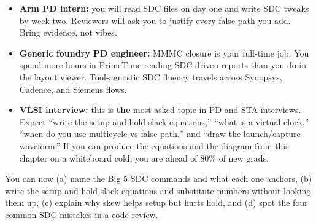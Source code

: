 \begin{pdnote}
\begin{itemize}
  \item \textbf{Arm PD intern:} you will read SDC files on day one and write SDC tweaks by week two. Reviewers will ask you to justify every false path you add. Bring evidence, not vibes.
  \item \textbf{Generic foundry PD engineer:} MMMC closure is your full-time job. You spend more hours in PrimeTime reading SDC-driven reports than you do in the layout viewer. Tool-agnostic SDC fluency travels across Synopsys, Cadence, and Siemens flows.
  \item \textbf{VLSI interview:} this is \textbf{the} most asked topic in PD and STA interviews. Expect ``write the setup and hold slack equations,'' ``what is a virtual clock,'' ``when do you use multicycle vs false path,'' and ``draw the launch/capture waveform.'' If you can produce the equations and the diagram from this chapter on a whiteboard cold, you are ahead of 80\% of new grads.
\end{itemize}
\end{pdnote}

\begin{checkpoint}
You can now (a) name the Big 5 SDC commands and what each one anchors, (b) write the setup and hold slack equations and substitute numbers without looking them up, (c) explain why skew helps setup but hurts hold, and (d) spot the four common SDC mistakes in a code review. 
\end{checkpoint}
